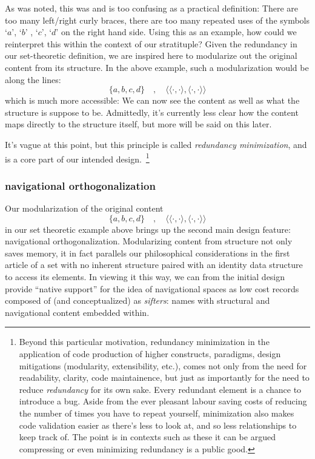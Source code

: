 \documentclass[twoside]{article}
\begin{document}
As was noted, this was and is too confusing as a practical definition: There are too many left/right curly braces,
there are too many repeated uses of the symbols `$ a $', `$ b $' , `$ c $', `$ d $' on the right hand side.
Using this as an example, how could we reinterpret this within the context of our stratituple? Given the redundancy
in our set-theoretic definition, we are inspired here to modularize out the original content from its structure.
In the above example, such a modularization would be along the lines:
$$ \{a,b,c,d\}\quad,\quad\langle\langle\cdot,\cdot\rangle,\langle\cdot,\cdot\rangle\rangle $$
which is much more accessible: We can now see the content as well as what the structure is suppose to be.
Admittedly, it's currently less clear how the content maps directly to the structure itself, but more will
be said on this later.

It's vague at this point, but this principle is called \emph{redundancy minimization}, and is a core part of our intended
design.~\footnote{Beyond this particular motivation, redundancy minimization in the application of code production of
higher constructs, paradigms, design mitigations (modularity, extensibility, etc.), comes not only from the need for
readability, clarity, code maintainence, but just as importantly for the need to reduce \emph{redundancy} for its own sake.
Every redundant element is a chance to introduce a bug. Aside from the ever pleasant labour saving costs of reducing
the number of times you have to repeat yourself, minimization also makes code validation easier as there's less
to look at, and so less relationships to keep track of. The point is in contexts such as these it can be argued
compressing or even minimizing redundancy is a public good.}

\subsubsection*{navigational orthogonalization}

Our modularization of the original content
$$ \{a,b,c,d\}\quad,\quad\langle\langle\cdot,\cdot\rangle,\langle\cdot,\cdot\rangle\rangle $$
in our set theoretic example above brings up the second main design feature: navigational orthogonalization.
Modularizing content from structure not only saves memory, it in fact parallels our philosophical considerations
in the first article of a set with no inherent structure paired with an identity data structure to access its elements.
In viewing it this way, we can from the initial design provide ``native support'' for the idea of navigational spaces
as low cost records composed of (and conceptualized) as \emph{sifters}: names with structural and navigational
content embedded within.
\end{document}
